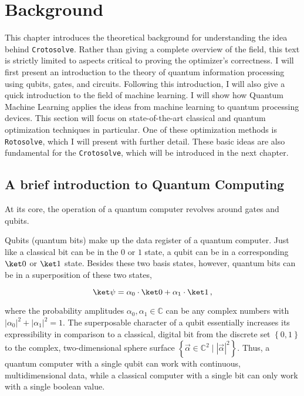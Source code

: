 \chapter{Background}
\label{chap:background}

This chapter introduces the theoretical background for understanding the idea
behind \texttt{Crotosolve}.
Rather than giving a complete overview of the field, this text is strictly
limited to aspects critical to proving the optimizer's correctness.
I will first present an introduction to the theory of quantum information
processing using qubits, gates, and circuits.
Following this introduction, I will also give a quick introduction to the field
of machine learning.
I will show how Quantum Machine Learning applies the ideas from machine learning
to quantum processing devices.
This section will focus on state-of-the-art classical and quantum optimization
techniques in particular.
One of these optimization methods is \texttt{Rotosolve}, which I will present
with further detail.
These basic ideas are also fundamental for the \texttt{Crotosolve}, which will
be introduced in the next chapter.

\section{A brief introduction to Quantum Computing}
At its core, the operation of a quantum computer revolves around gates and
qubits.

Qubits (quantum bits) make up the data register of a quantum computer.
Just like a classical bit can be in the $0$ or $1$ state, a qubit can be in a
corresponding $\ket 0$ or $\ket 1$ state.
Besides these two basis states, however, quantum bits can be in a superposition
of these two states,

$$\ket \psi = \alpha_0 \cdot \ket 0 + \alpha_1 \cdot \ket 1\,,$$

where the probability amplitudes $\alpha_0, \alpha_1 \in \mathbb C$ can be any
complex numbers with $\left|\alpha_0\right|^2 + \left|\alpha_1\right|^2 = 1$.
The superposable character of a qubit essentially increases its expressibility
in comparison to a classical, digital bit from the discrete set
$\left\{0, 1\right\}$ to the complex, two-dimensional sphere surface
$\left\{\vec \alpha \in \mathbb C^2 \mid \left|\vec\alpha\right|^2\right\}$.
Thus, a quantum computer with a single qubit can work with continuous,
multidimensional data, while a classical computer with a single bit can only
work with a single boolean value.

